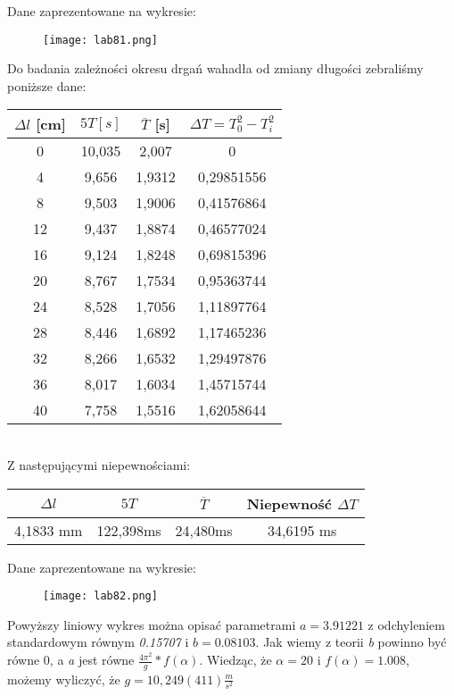 \documentclass{article}
\begin{document}
Dane zaprezentowane na wykresie:
\begin{figure}[H]
\centerline{\texttt{[image: lab81.png]}}
\end{figure}
Do badania zależności okresu drgań wahadła od zmiany długości zebraliśmy poniższe dane:
\begin{table}[h!]
    \centering
    \begin{tabular}{|c|c|c|c|} \hline
    $\Delta l$ [cm] & $ 5T [s]$  & $\overline{T}$ [s] & $\Delta T = T^2_{0} - T^2_{i}$ \\ \hline
    0	&	10,035	&	2,007	&	0	\\
    4	&	9,656	&	1,9312	&	0,29851556	\\
    8	&	9,503	&	1,9006	&	0,41576864	\\
    12	&	9,437	&	1,8874	&	0,46577024	\\
    16	&	9,124	&	1,8248	&	0,69815396	\\
    20	&	8,767	&	1,7534	&	0,95363744	\\
    24	&	8,528	&	1,7056	&	1,11897764	\\
    28	&	8,446	&	1,6892	&	1,17465236	\\
    32	&	8,266	&	1,6532	&	1,29497876	\\
    36	&	8,017	&	1,6034	&	1,45715744	\\
    40	&	7,758	&	1,5516	&	1,62058644	\\ \hline
    \end{tabular}
\end{table}\\
Z następującymi niepewnościami:
\begin{table}[h!]
    \centering
    \begin{tabular}{|c|c|c|c|} \hline
    $\Delta l$ & $ 5T $  & $\overline{T}$ & Niepewność $\Delta T$\\ \hline
    4,1833 mm	&   122,398ms	&	24,480ms & 34,6195 ms	\\ \hline
    \end{tabular}
\end{table}
Dane zaprezentowane na wykresie:
\begin{figure}[H]
\centerline{\texttt{[image: lab82.png]}}
\end{figure}
Powyższy liniowy wykres można opisać parametrami \textit{$a = 3.91221$} z odchyleniem standardowym równym \textit{0.15707} i \textit{$b = 0.08103$}.
Jak wiemy z teorii \textit{b} powinno być równe 0, a \textit{a} jest równe $\frac{4\pi^2}{g}* f(\alpha)$.
Wiedząc, że $\alpha = 20$ i $f(\alpha) = 1.008$, możemy wyliczyć, że $g = 10,249(411) \frac{m}{s^2}$ 
\end{document}
